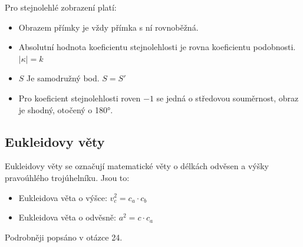         Pro stejnolehlé zobrazení platí:
        \begin{itemize}
            \item Obrazem přímky je vždy přímka s ní rovnoběžná.
            \item Absolutní hodnota koeficientu stejnolehlosti je rovna koeficientu podobnosti.\\ $|\kappa| = k$
            \item $S$ Je samodružný bod. $S=S'$
            \item Pro koeficient stejnolehlosti roven $-1$ se jedná o středovou souměrnost, obraz je shodný, otočený o 180°.
        \end{itemize}

    \subsection{Eukleidovy věty}
        Eukleidovy věty se označují matematické věty o délkách odvěsen a výšky pravoúhlého trojúhelníku. Jsou to:
        \begin{itemize}
            \item Eukleidova věta o výšce: $v_c^2 = c_a \cdot c_b$
            \item Eukleidova věta o odvěsně: $a^2 = c \cdot c_a$
        \end{itemize}
        Podrobněji popsáno v otázce 24.